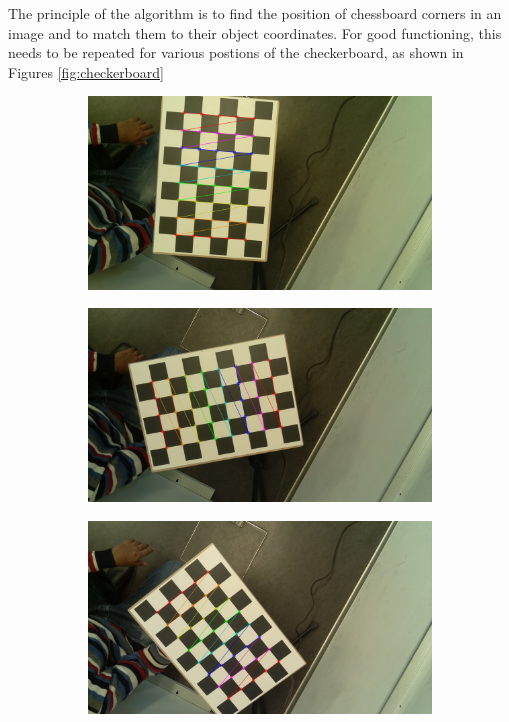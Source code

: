 The principle of the algorithm is to find the position of chessboard corners in an image and to match them to their object coordinates. For good functioning, this needs to be repeated for various postions of the checkerboard, as shown in Figures \ref{fig:checkerboard}

\begin{figure}[H]
    \centering
    \begin{subfigure}{0.2\linewidth}
        \includegraphics[width=\linewidth]{files/output145_1.jpg}
    \end{subfigure} 
    \begin{subfigure}{0.2\linewidth}
        \includegraphics[width=\linewidth]{files/output145_2.jpg}
    \end{subfigure}
    \begin{subfigure}{0.2\linewidth}
        \includegraphics[width=\linewidth]{files/output145_3.jpg}

\end{subfigure}
\end{figure}
